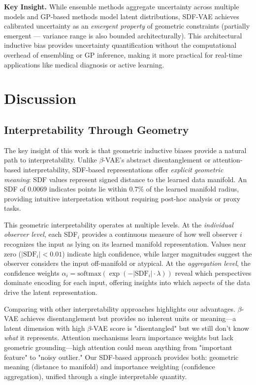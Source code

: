\documentclass[10pt,twocolumn,letterpaper]{article}
\begin{document}
\textbf{Key Insight.} While ensemble methods aggregate uncertainty across multiple models and GP-based methods model latent distributions, SDF-VAE achieves calibrated uncertainty as an \textit{emergent property} of geometric constraints (partially emergent --- variance range is also bounded architecturally). This architectural inductive bias provides uncertainty quantification without the computational overhead of ensembling or GP inference, making it more practical for real-time applications like medical diagnosis or active learning.

\clearpage

\section{Discussion}

\subsection{Interpretability Through Geometry}

The key insight of this work is that geometric inductive biases provide a natural path to interpretability. Unlike $\beta$-VAE's abstract disentanglement or attention-based interpretability, SDF-based representations offer \textit{explicit geometric meaning}: SDF values represent signed distance to the learned data manifold. An SDF of 0.0069 indicates points lie within 0.7\% of the learned manifold radius, providing intuitive interpretation without requiring post-hoc analysis or proxy tasks.

This geometric interpretability operates at multiple levels. At the \textit{individual observer level}, each SDF$_i$ provides a continuous measure of how well observer $i$ recognizes the input as lying on its learned manifold representation. Values near zero ($|\text{SDF}_i| < 0.01$) indicate high confidence, while larger magnitudes suggest the observer considers the input off-manifold or atypical. At the \textit{aggregation level}, the confidence weights $\alpha_i = \text{softmax}(\exp(-|\text{SDF}_i| \cdot \lambda))$ reveal which perspectives dominate encoding for each input, offering insights into which aspects of the data drive the latent representation.

Comparing with other interpretability approaches highlights our advantages. $\beta$-VAE achieves disentanglement but provides no inherent units or meaning—a latent dimension with high $\beta$-VAE score is "disentangled" but we still don't know \textit{what} it represents. Attention mechanisms learn importance weights but lack geometric grounding—high attention could mean anything from "important feature" to "noisy outlier." Our SDF-based approach provides both: geometric meaning (distance to manifold) and importance weighting (confidence aggregation), unified through a single interpretable quantity.
\end{document}
